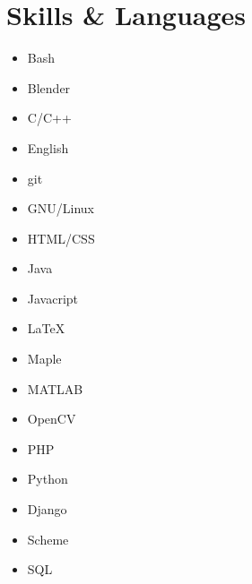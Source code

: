 \documentclass[a4paper,10pt]{article}
\begin{document}
\section{Skills \& Languages}
\begin{multicols}{3}
\raggedcolumns
\begin{itemize}
\renewcommand{\labelitemi}{\textcolor{lightg}{\symbol{"00BB}}}
\setlength{\itemsep}{1pt}
\setlength{\parskip}{0pt}
\setlength{\parsep}{0pt}
\item Bash \hfill \fournotes
\item Blender \hfill \threenotes
\item C/C++ \hfill \fournotes 
\item English \hfill \fivenotes
\item git \hfill \fournotes
\item GNU/Linux \hfill \fournotes
\item HTML/CSS \hfill \fournotes
\item Java \hfill \fivenotes
\item Javacript \hfill \threenotes
\item \LaTeX \hfill \threenotes
\item Maple \hfill \threenotes
\item MATLAB \hfill \fivenotes
\item OpenCV \hfill \fournotes
\item PHP \hfill \fournotes
\item Python \hfill \fournotes
\item Django \hfill \fournotes
\item Scheme \hfill \fivenotes
\item SQL \hfill \threenotes
\end{itemize}
\end{multicols}
\end{document}
